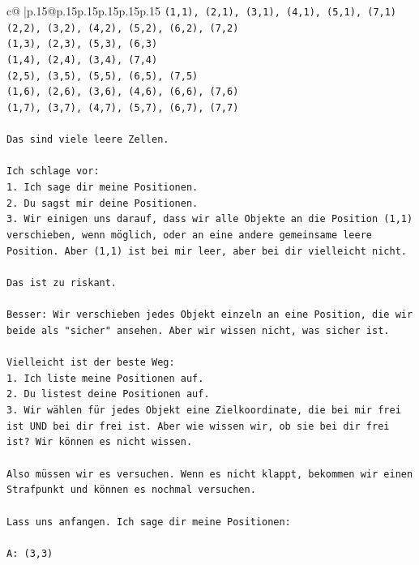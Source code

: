 \documentclass{article}
\begin{document}
{\begin{supertabular}{c@{$\;$}|p{.15\linewidth}@{}p{.15\linewidth}p{.15\linewidth}p{.15\linewidth}p{.15\linewidth}p{.15\linewidth}}
{{{\texttt{(1,1), (2,1), (3,1), (4,1), (5,1), (7,1)} \\
\texttt{(2,2), (3,2), (4,2), (5,2), (6,2), (7,2)} \\
\texttt{(1,3), (2,3), (5,3), (6,3)} \\
\texttt{(1,4), (2,4), (3,4), (7,4)} \\
\texttt{(2,5), (3,5), (5,5), (6,5), (7,5)} \\
\texttt{(1,6), (2,6), (3,6), (4,6), (6,6), (7,6)} \\
\texttt{(1,7), (3,7), (4,7), (5,7), (6,7), (7,7)} \\
\\ 
\texttt{Das sind viele leere Zellen.} \\
\\ 
\texttt{Ich schlage vor:} \\
\texttt{1. Ich sage dir meine Positionen.} \\
\texttt{2. Du sagst mir deine Positionen.} \\
\texttt{3. Wir einigen uns darauf, dass wir alle Objekte an die Position (1,1) verschieben, wenn möglich, oder an eine andere gemeinsame leere Position. Aber (1,1) ist bei mir leer, aber bei dir vielleicht nicht.} \\
\\ 
\texttt{Das ist zu riskant.} \\
\\ 
\texttt{Besser: Wir verschieben jedes Objekt einzeln an eine Position, die wir beide als "sicher" ansehen. Aber wir wissen nicht, was sicher ist.} \\
\\ 
\texttt{Vielleicht ist der beste Weg:} \\
\texttt{1. Ich liste meine Positionen auf.} \\
\texttt{2. Du listest deine Positionen auf.} \\
\texttt{3. Wir wählen für jedes Objekt eine Zielkoordinate, die bei mir frei ist UND bei dir frei ist. Aber wie wissen wir, ob sie bei dir frei ist? Wir können es nicht wissen.} \\
\\ 
\texttt{Also müssen wir es versuchen. Wenn es nicht klappt, bekommen wir einen Strafpunkt und können es nochmal versuchen.} \\
\\ 
\texttt{Lass uns anfangen. Ich sage dir meine Positionen:} \\
\\ 
\texttt{A: (3,3)} \\
}}}
\end{supertabular}}
\end{document}
